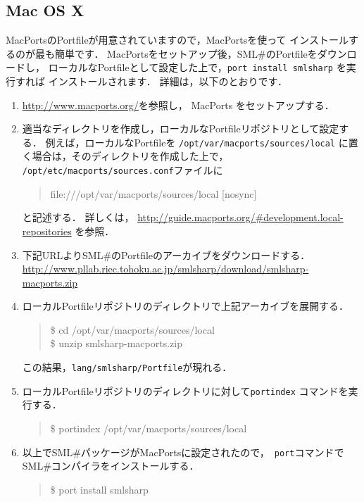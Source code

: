 \documentclass{jbook}
\newcommand{\txt}[2]{#2}
\newcommand{\smlsharp}{SML\#}
\newenvironment{program}{\begin{tt}\begin{quote}}{\end{quote}\end{tt}}
\begin{document}
\subsection{\txt{Mac OS X}{Mac OS X}}
\ifx\jp%
	MacPortsのPortfileが用意されていますので，MacPortsを使って
インストールするのが最も簡単です．
	MacPortsをセットアップ後，\smlsharp{}のPortfileをダウンロードし，
ローカルなPortfileとして設定した上で，{\tt port install smlsharp} を実行すれば
インストールされます．
	詳細は，以下のとおりです．
\begin{enumerate}
\item 
\url{http://www.macports.org/}を参照し，
MacPorts をセットアップする．

\item 
	適当なディレクトリを作成し，ローカルなPortfileリポジトリとして設定する．
	例えば，ローカルなPortfileを {\tt /opt/var/macports/sources/local}
に置く場合は，そのディレクトリを作成した上で，
{\tt /opt/etc/macports/sources.conf}ファイルに
\begin{program}
file:///opt/var/macports/sources/local [nosync]
\end{program}
と記述する．
	詳しくは，
\url{http://guide.macports.org/#development.local-repositories}
を参照．

\item 
	下記URLより\smlsharp{}のPortfileのアーカイブをダウンロードする．
\url{http://www.pllab.riec.tohoku.ac.jp/smlsharp/download/smlsharp-macports.zip}

\item 
	ローカルPortfileリポジトリのディレクトリで上記アーカイブを展開する．
\begin{program}
\$ cd /opt/var/macports/sources/local\\
\$ unzip smlsharp-macports.zip
\end{program}
	この結果，{\tt lang/smlsharp/Portfile}が現れる．

\item
	 ローカルPortfileリポジトリのディレクトリに対して{\tt portindex}
コマンドを実行する．
\begin{program}
\$ portindex /opt/var/macports/sources/local
\end{program}

\item 
	以上で\smlsharp{}パッケージがMacPortsに設定されたので，{\tt
port}コマンドで\smlsharp{}コンパイラをインストールする．
\begin{program}
\$ port install smlsharp
\end{program}
\end{enumerate}
\end{document}
